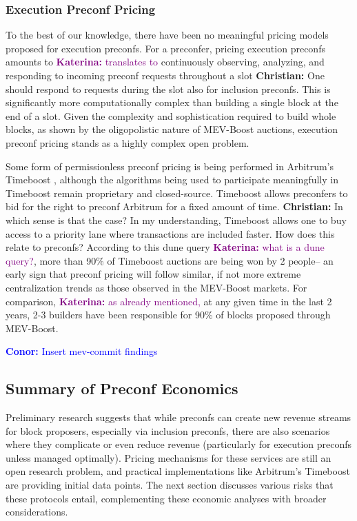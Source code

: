 \documentclass[a4paper]{article}
\theoremstyle{boldstyle}
\newcommand{\cm}[1]{\textcolor{blue}{\textbf{Conor:} #1}}
\newcommand{\ks}[1]{\textcolor{purple}{\textbf{Katerina:} #1}}
\newcommand{\chm}[1]{\textcolor{OliveGreen}{\textbf{Christian:} #1}}
\begin{document}
    \subsubsection{Execution Preconf Pricing}

    To the best of our knowledge, there have been no meaningful pricing models proposed for execution preconfs. For a preconfer, pricing execution preconfs amounts to \ks{translates to} continuously observing, analyzing, and responding to incoming preconf requests throughout a slot \chm{One should respond to requests during the slot also for inclusion preconfs}. This is significantly more computationally complex than building a single block at the end of a slot. Given the complexity and sophistication required to build whole blocks, as shown by the oligopolistic nature of MEV-Boost auctions, execution preconf pricing stands as a highly complex open problem. 
    
    Some form of permissionless preconf pricing is being performed in Arbitrum's Timeboost \cite{TimeBoostDocs}, although the algorithms being used to participate meaningfully in Timeboost remain proprietary and closed-source. Timeboost allows preconfers to bid for the right to preconf Arbitrum for a fixed amount of time. \chm{In which sense is that the case? In my understanding, Timeboost allows one to buy access to a priority lane where transactions are included faster. How does this relate to preconfs?} According to this dune query \cite{TimeboostAuctionWinnerBreakdown} \ks{what is a dune query?}, more than 90\% of Timeboost auctions are being won by 2 people-- an early sign that preconf pricing will follow similar, if not more extreme centralization trends as those observed in the MEV-Boost markets. For comparison, \ks{as already mentioned,} at any given time in the last 2 years, 2-3 builders have been responsible for 90\% of blocks proposed through MEV-Boost\cite{MEVBoostShares}.

    \cm{Insert mev-commit findings}

    

    \subsection{Summary of Preconf Economics}

    Preliminary research suggests that while preconfs can create new revenue streams for block proposers, especially via inclusion preconfs, there are also scenarios where they complicate or even reduce revenue (particularly for execution preconfs unless managed optimally). Pricing mechanisms for these services are still an open research problem, and practical implementations like Arbitrum’s Timeboost are providing initial data points. The next section discusses various risks that these protocols entail, complementing these economic analyses with broader considerations.
\end{document}

